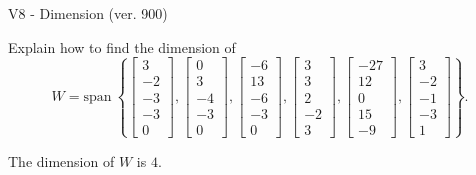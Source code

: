 \begin{exercise}
  \begin{exerciseTitle}V8 - Dimension (ver. 900)\end{exerciseTitle}
  \begin{exerciseStatement}
    Explain how to find the dimension of 
\[W=\mathrm{span}\ \left\{\left[\begin{array}{r}
3 \\
-2 \\
-3 \\
-3 \\
0
\end{array}\right] , \left[\begin{array}{r}
0 \\
3 \\
-4 \\
-3 \\
0
\end{array}\right] , \left[\begin{array}{r}
-6 \\
13 \\
-6 \\
-3 \\
0
\end{array}\right] , \left[\begin{array}{r}
3 \\
3 \\
2 \\
-2 \\
3
\end{array}\right] , \left[\begin{array}{r}
-27 \\
12 \\
0 \\
15 \\
-9
\end{array}\right] , \left[\begin{array}{r}
3 \\
-2 \\
-1 \\
-3 \\
1
\end{array}\right]\right\}.\]



  \end{exerciseStatement}
  \begin{exerciseAnswer}
   The dimension of \(W\) is  \(4\).
  


  \end{exerciseAnswer}
\end{exercise}
